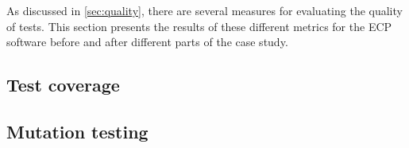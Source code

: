 
As discussed in \ref{sec:quality}, there are several measures for
evaluating the quality of tests. This section presents the results of
these different metrics for the ECP software before and after different
parts of the case study.\\


\subsection{Test coverage}
    

\subsection{Mutation testing}
    
